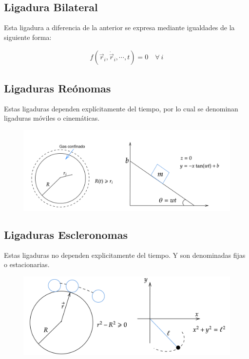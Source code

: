\documentclass[../main]{subfiles}
\begin{document}
\subsection*{Ligadura Bilateral}
Esta ligadura a diferencia de la anterior se expresa mediante igualdades de la siguiente forma:

\begin{align}
    f(\vec{r}_i, \dot{\vec{r}}_i, \cdots, t) = 0 \quad \forall \ i
\end{align}

\subsection*{Ligaduras Reónomas}

Estas ligaduras dependen explícitamente del tiempo, por lo cual se denominan ligaduras móviles o cinemáticas.

    \begin{figure}[ht]
        \centering
        \includegraphics[scale=0.15]{../assets/images/lig3.png}
        \label{fig:fig4}
    \end{figure}

\subsection*{Ligaduras Escleronomas}

Estas ligaduras no dependen explicitamente del tiempo. Y son denominadas fijas o estacionarias.

    \begin{figure}
        \centering
        \includegraphics[scale=0.22]{../assets/images/lig4.png}
        \label{fig:fig5}
    \end{figure}
    
\end{document}
